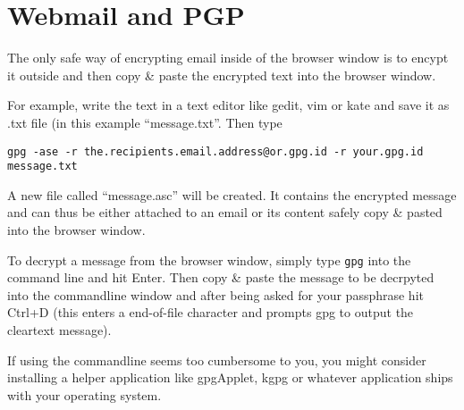 \section{Webmail and PGP}

The only safe way of encrypting email inside of the browser window is to
encypt it outside and then copy \& paste the encrypted text into the
browser window.

For example, write the text in a text editor like gedit, vim or kate and
save it as .txt file (in this example ``message.txt''. Then type

\begin{verbatim}
gpg -ase -r the.recipients.email.address@or.gpg.id -r your.gpg.id message.txt
\end{verbatim}
A new file called ``message.asc'' will be created. It contains the
encrypted message and can thus be either attached to an email or its
content safely copy \& pasted into the browser window.

To decrypt a message from the browser window, simply type \verb!gpg!
into the command line and hit Enter. Then copy \& paste the message to
be decrpyted into the commandline window and after being asked for your
passphrase hit Ctrl+D (this enters a end-of-file character and prompts
gpg to output the cleartext message).

If using the commandline seems too cumbersome to you, you might consider
installing a helper application like gpgApplet, kgpg or whatever
application ships with your operating system.
